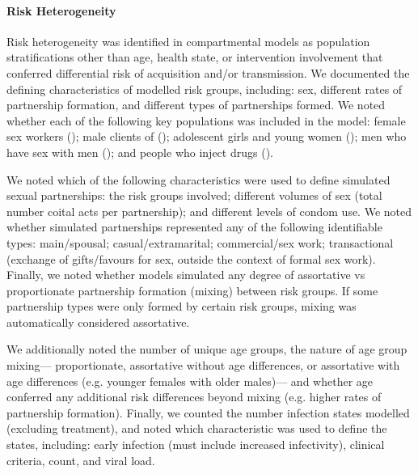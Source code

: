 \paragraph{Risk Heterogeneity}
Risk heterogeneity was identified in compartmental models
as population stratifications other than age, health state, or intervention involvement
that conferred differential risk of \hiv acquisition and/or transmission.
We documented the defining characteristics of modelled risk groups, including:
sex, different rates of partnership formation, and different types of partnerships formed.
We noted whether each of the following key populations was included in the model:
female sex workers (\fsw);
male clients of \fsw (\cli);
adolescent girls and young women (\agyw);
men who have sex with men (\msm);
and people who inject drugs (\pwid).
\par
We noted which of the following characteristics were used to define
simulated sexual partnerships:
the risk groups involved;
different volumes of sex (total number coital acts per partnership); and
different levels of condom use.
We noted whether simulated partnerships represented
any of the following identifiable types:
main/spousal;
casual/extramarital;
commercial/sex work;
transactional (exchange of gifts/favours for sex,
outside the context of formal sex work). %
Finally, we noted whether models simulated any degree of assortative vs proportionate
partnership formation (mixing) between risk groups.
If some partnership types were only formed by certain risk groups,
mixing was automatically considered assortative.
\par
We additionally noted the number of unique age groups, the nature of age group mixing---%
proportionate, assortative without age differences, or assortative with age differences
(e.g. younger females with older males)---%
and whether age conferred any additional risk differences beyond mixing
(e.g. higher rates of partnership formation).
Finally, we counted the number \hiv infection states modelled (excluding treatment),
and noted which characteristic was used to define the states, including:
early infection (must include increased infectivity),
\who clinical criteria, \cdf count, and viral load.
